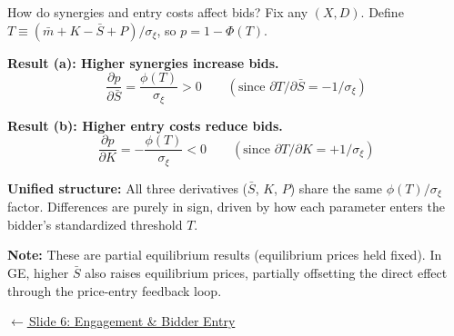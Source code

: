 \documentclass[aspectratio=169,10pt]{beamer}
\newcommand{\1}{\mathbf{1}}
\newcommand{\returnlink}[2]{%
  \par\vspace{0.2em}\hfill{\scriptsize\hyperlink{#1}{\textcolor{brightblue}{$\leftarrow$\,#2}}}%
}
\begin{document}
\begin{frame}{How do synergies and entry costs affect bids?}
\hypertarget{backup:takeover_comps}{}
\small
Fix any $(X,D)$. Define $T \equiv (\bar{m} + K - \bar{S} + P)/\sigma_\xi$, so $p = 1 - \Phi(T)$.

\vspace{0.3em}

\textbf{Result (a): Higher synergies increase bids.}
\[
\frac{\partial p}{\partial \bar{S}} = \frac{\phi(T)}{\sigma_\xi} > 0 \qquad (\text{since } \partial T / \partial \bar{S} = -1/\sigma_\xi)
\]

\vspace{0.3em}

\textbf{Result (b): Higher entry costs reduce bids.}
\[
\frac{\partial p}{\partial K} = -\frac{\phi(T)}{\sigma_\xi} < 0 \qquad (\text{since } \partial T / \partial K = +1/\sigma_\xi)
\]

\vspace{0.3em}

{\footnotesize\textbf{Unified structure:} All three derivatives ($\bar{S}$, $K$, $P$) share the same $\phi(T)/\sigma_\xi$ factor. Differences are purely in sign, driven by how each parameter enters the bidder's standardized threshold $T$.}

\vspace{0.2em}

{\footnotesize\textbf{Note:} These are partial equilibrium results (equilibrium prices held fixed). In GE, higher $\bar{S}$ also raises equilibrium prices, partially offsetting the direct effect through the price-entry feedback loop.}

\returnlink{main:engagement}{Slide 6: Engagement \& Bidder Entry}
\end{frame}
\end{document}
